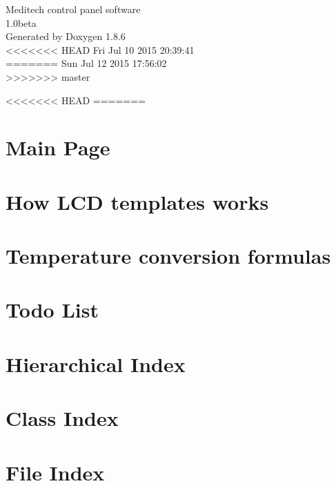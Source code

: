 \documentclass[twoside]{book}
\newcommand{\clearemptydoublepage}{%
  \newpage{\pagestyle{empty}\cleardoublepage}%
}
\begin{document}
\hypersetup{pageanchor=false}
\begin{titlepage}
\vspace*{7cm}
\begin{center}%
{\Large Meditech control panel software \\[1ex]\large 1.\-0beta }\\
\vspace*{1cm}
{\large Generated by Doxygen 1.8.6}\\
\vspace*{0.5cm}
<<<<<<< HEAD
{\small Fri Jul 10 2015 20:39:41}\\
=======
{\small Sun Jul 12 2015 17:56:02}\\
>>>>>>> master
\end{center}
\end{titlepage}
\clearemptydoublepage
\tableofcontents
\clearemptydoublepage
{}
\hypersetup{pageanchor=true}

<<<<<<< HEAD
=======
\chapter{Main Page}
\label{index}\hypertarget{index}{}
\chapter{How L\-C\-D templates works}
\label{lcd_template}
\hypertarget{lcd_template}{}

\chapter{Temperature conversion formulas}
\label{temp_convert}
\hypertarget{temp_convert}{}

\chapter{Todo List}
\label{todo}
\hypertarget{todo}{}

\chapter{Hierarchical Index}

\chapter{Class Index}

\chapter{File Index}

\end{document}
